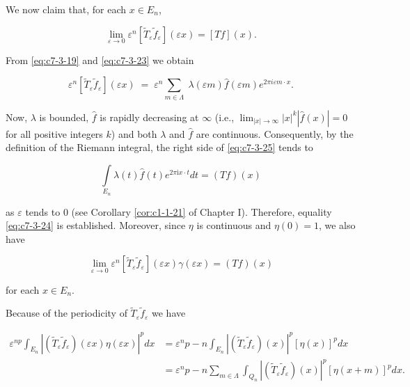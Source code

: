 We now claim that, for each $x \in E_n$,

\begin{equation}\label{eq:c7-3-24}
\lim_{\varepsilon\to0}\varepsilon^{n}[\widetilde{T}_{\varepsilon}\widetilde{f}_{\varepsilon}](\varepsilon x)=[T f](x).
\end{equation}

From \eqref{eq:c7-3-19} and \eqref{eq:c7-3-23} we obtain

\begin{equation}\label{eq:c7-3-25}
\varepsilon^{n}[\widetilde{T}_{\varepsilon}\widetilde{f}_{\varepsilon}](\varepsilon x)\;=\;\varepsilon^{n}\sum_{m\in\Lambda}\;\lambda(\varepsilon m)\widehat{f}(\varepsilon m)e^{2\pi i\varepsilon m\cdot x}.
\end{equation}

Now, $\lambda$ is bounded, $\hat{f}$ is rapidly decreasing at $\infty$ (i.e., $\lim_{|x|\to\infty}|x|^{k}|\hat{f}(x)|=0$ for all positive integers $k$) and both $\lambda$ and $\hat{f}$ are continuous. Consequently, by the definition of the Riemann integral, the right side of \eqref{eq:c7-3-25} tends to

\[
\int\limits_{E_{n}}\lambda(t)\hat{f}(t)e^{2\pi\mathrm{i}x\cdot t}dt=(Tf)(x)
\]

as $\varepsilon$ tends to 0 (see Corollary \ref{cor:c1-1-21} of Chapter I). Therefore, equality \eqref{eq:c7-3-24} is established. Moreover, since $\eta$ is continuous and $\eta(0) = 1$, we also have

\begin{equation}\label{eq:c7-3-26}
\lim_{\varepsilon\to0}\varepsilon^{n}[\widetilde{T}_{\varepsilon}\widetilde{f}_{\varepsilon}](\varepsilon x)\gamma(\varepsilon x)=(T f)(x)
\end{equation}

for each $x \in E_n$.

Because of the periodicity of $\tilde{T}_{\varepsilon}\tilde{f}_{\varepsilon}$ we have

\[
\begin{aligned}{\varepsilon^{n p}\int_{E_{n}}|(\widetilde{T}_{\varepsilon}\widetilde{f}_{\varepsilon})(\varepsilon x)\eta(\varepsilon x)|^{p}d x}&{{}=\varepsilon^np-n\int_{E_{n}}|(\widetilde{T}_{\varepsilon}\widetilde{f}_{\varepsilon})(x)|^{p}[\eta(x)]^{p}d x}\\ {}&{{}=\varepsilon^np-n\sum_{m\in\Lambda}\int_{Q_{n}}|(\widetilde{T}_{\varepsilon}\widetilde{f}_{\varepsilon})(x)|^{p}[\eta(x+m)]^{p}d x.}\\ \end{aligned}
\]

